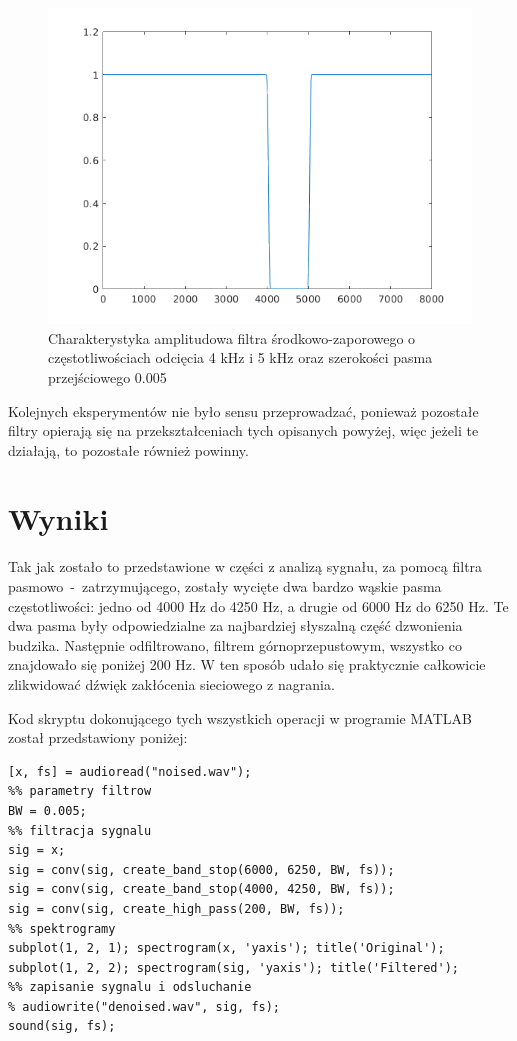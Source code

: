 \begin{figure}
\centering
\includegraphics{dane/bandstop0005.png} %
\caption{Charakterystyka amplitudowa filtra środkowo-zaporowego o częstotliwościach odcięcia \num{4} kHz i \num{5} kHz oraz szerokości pasma przejściowego \num{0.005}}
\label{bandstop0005}
\end{figure}

Kolejnych eksperymentów nie było sensu przeprowadzać, ponieważ pozostałe filtry opierają się na przekształceniach tych opisanych powyżej, więc jeżeli te działają, to pozostałe również powinny.

\chapter{Wyniki}
Tak jak zostało to przedstawione w części z analizą sygnału, za pomocą filtra pasmowo~-~zatrzymującego, zostały wycięte dwa bardzo wąskie pasma częstotliwości: jedno od \num{4000} Hz do \num{4250} Hz, a drugie od \num{6000} Hz do \num{6250} Hz.
Te dwa pasma były odpowiedzialne za najbardziej słyszalną część dzwonienia budzika.
Następnie odfiltrowano, filtrem górnoprzepustowym, wszystko co znajdowało się poniżej \num{200} Hz.
W ten sposób udało się praktycznie całkowicie zlikwidować dźwięk zakłócenia sieciowego z nagrania.

Kod skryptu dokonującego tych wszystkich operacji w programie MATLAB został przedstawiony poniżej:

\begin{lstlisting}[style=Matlab-editor]
%% wczytywanie sygnalu
[x, fs] = audioread("noised.wav");
%% parametry filtrow
BW = 0.005;
%% filtracja sygnalu
sig = x;
sig = conv(sig, create_band_stop(6000, 6250, BW, fs));
sig = conv(sig, create_band_stop(4000, 4250, BW, fs));
sig = conv(sig, create_high_pass(200, BW, fs));
%% spektrogramy
subplot(1, 2, 1); spectrogram(x, 'yaxis'); title('Original');
subplot(1, 2, 2); spectrogram(sig, 'yaxis'); title('Filtered');
%% zapisanie sygnalu i odsluchanie
% audiowrite("denoised.wav", sig, fs);
sound(sig, fs);
\end{lstlisting}

